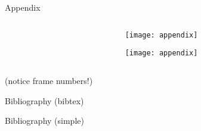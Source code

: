 \begin{frame}[fragile]{Appendix\magicPage}\relax
    \begin{columns}
        \begin{column}{0.45\textwidth}
            \expandafter\inputminted[firstline=8, lastline=17]{latex}{sec02/code/appendix.tex}
        \end{column}
        \begin{column}{0.45\textwidth}
            \texttt{[image: appendix]}
            
            \texttt{[image: appendix]}
        \end{column}
    \end{columns}
    
    (notice frame numbers!)
    
\end{frame}

\begin{frame}[fragile]{Bibliography (bibtex)\magicPage}\relax
    \cprotect{}
\end{frame}

\begin{frame}[fragile]{Bibliography (simple)\magicPage}\relax
    \cprotect{}
\end{frame}
